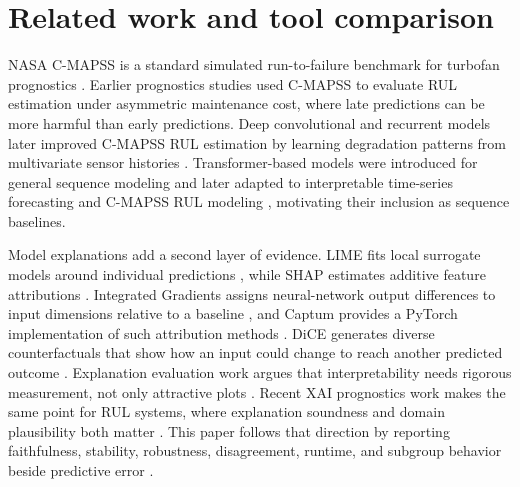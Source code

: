 \documentclass[conference]{IEEEtran}
\begin{document}
\section{Related work and tool comparison}
NASA C-MAPSS is a standard simulated run-to-failure benchmark for turbofan prognostics \cite{saxena2008damage,nasaCmapssOpenData}. Earlier prognostics studies used C-MAPSS to evaluate RUL estimation under asymmetric maintenance cost, where late predictions can be more harmful than early predictions. Deep convolutional and recurrent models later improved C-MAPSS RUL estimation by learning degradation patterns from multivariate sensor histories \cite{babu2016deep,li2018deepcnn,zheng2017lstm}. Transformer-based models were introduced for general sequence modeling \cite{vaswani2017attention} and later adapted to interpretable time-series forecasting and C-MAPSS RUL modeling \cite{lim2021temporal,kim2024transformer}, motivating their inclusion as sequence baselines.

Model explanations add a second layer of evidence. LIME fits local surrogate models around individual predictions \cite{ribeiro2016lime}, while SHAP estimates additive feature attributions \cite{lundberg2017shap}. Integrated Gradients assigns neural-network output differences to input dimensions relative to a baseline \cite{sundararajan2017integrated}, and Captum provides a PyTorch implementation of such attribution methods \cite{kokhlikyan2020captum}. DiCE generates diverse counterfactuals that show how an input could change to reach another predicted outcome \cite{mothilal2020dice}. Explanation evaluation work argues that interpretability needs rigorous measurement, not only attractive plots \cite{doshi2017rigorous}. Recent XAI prognostics work makes the same point for RUL systems, where explanation soundness and domain plausibility both matter \cite{solismartin2023soundness,youness2023xai}. This paper follows that direction by reporting faithfulness, stability, robustness, disagreement, runtime, and subgroup behavior beside predictive error \cite{samek2017evaluating,yeh2019infidelity,alvarez2018robustness,guidotti2018survey}.
\end{document}
